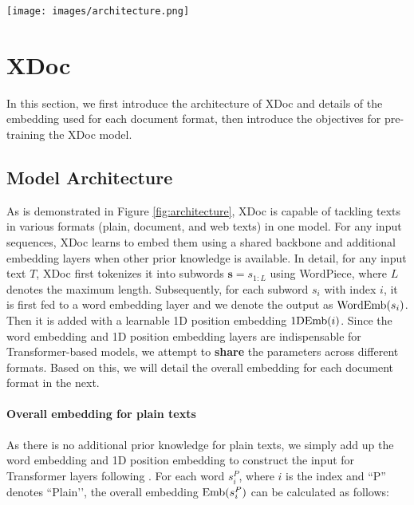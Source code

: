 \documentclass[11pt]{article}
\begin{document}
\begin{figure*}[t]
    \centering
    \texttt{[image: images/architecture.png]}
    \caption{XDoc tackles multiple formats in one model while sharing most parameters including 1D position embedding, word embedding, and dense Transformer layers. An \textit{optional} embedding layer and adaptive layer are utilized for specific prior knowledge such as 2D position for document texts and XPaths for web texts (no additional prior for plain texts). We demonstrate the dataflow for document texts and use \textit{dash} lines for other formats.}
    \label{fig:architecture}
\end{figure*}

\section{XDoc}

In this section, we first introduce the architecture of XDoc and details of the embedding used for each document format, then introduce the objectives for pre-training the XDoc model.



\subsection{Model Architecture}
As is demonstrated in Figure \ref{fig:architecture}, XDoc is capable of tackling texts in various formats (plain, document, and web texts) in one model. For any input sequences, XDoc learns to embed them using a shared backbone and additional embedding layers when other prior knowledge is available. In detail, for any input text $T$, XDoc first tokenizes it into subwords $\mathbf{s}=s_{1:L}$ using WordPiece, where $L$ denotes the maximum length. Subsequently, for each subword $s_{i}$ with index $i$, it is first fed to a word embedding layer and we denote the output as ${\rm WordEmb}(s_{i})$. Then it is added with a learnable 1D position embedding ${\rm 1DEmb}(i)$. Since the word embedding and 1D position embedding layers are indispensable for Transformer-based models, we attempt to \textbf{share} the parameters across different formats. Based on this, we will detail the overall embedding for each document format in the next.

\paragraph{Overall embedding for plain texts} As there is no additional prior knowledge for plain texts, we simply add up the word embedding and 1D position embedding to construct the input for Transformer layers following \cite{devlin2018bert,liu2019roberta}. For each word $s_{i}^{P}$, where $i$ is the index and ``P'' denotes ``Plain’’, the overall embedding ${\rm Emb}(s_{i}^{P})$ can be calculated as follows:
\end{document}
